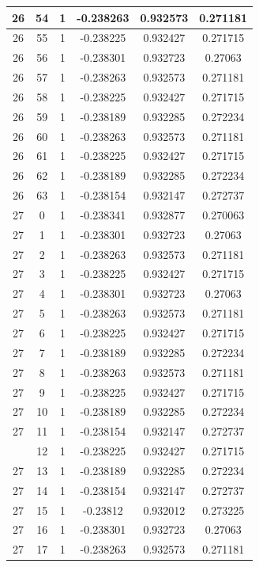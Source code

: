 \documentclass[12pt,a4paper]{article}
\numberwithin{equation}{section}
\numberwithin{figure}{section}
\numberwithin{table}{section}
\begin{document}
\begin{longtable}{|c|c|c|c|c|c|}
26 & 54 & 1 & -0.238263 & 0.932573 & 0.271181 \\ \hline
26 & 55 & 1 & -0.238225 & 0.932427 & 0.271715 \\ \hline
26 & 56 & 1 & -0.238301 & 0.932723 & 0.27063 \\ \hline
26 & 57 & 1 & -0.238263 & 0.932573 & 0.271181 \\ \hline
26 & 58 & 1 & -0.238225 & 0.932427 & 0.271715 \\ \hline
26 & 59 & 1 & -0.238189 & 0.932285 & 0.272234 \\ \hline
26 & 60 & 1 & -0.238263 & 0.932573 & 0.271181 \\ \hline
26 & 61 & 1 & -0.238225 & 0.932427 & 0.271715 \\ \hline
26 & 62 & 1 & -0.238189 & 0.932285 & 0.272234 \\ \hline
26 & 63 & 1 & -0.238154 & 0.932147 & 0.272737 \\ \hline
27 & 0 & 1 & -0.238341 & 0.932877 & 0.270063 \\ \hline
27 & 1 & 1 & -0.238301 & 0.932723 & 0.27063 \\ \hline
27 & 2 & 1 & -0.238263 & 0.932573 & 0.271181 \\ \hline
27 & 3 & 1 & -0.238225 & 0.932427 & 0.271715 \\ \hline
27 & 4 & 1 & -0.238301 & 0.932723 & 0.27063 \\ \hline
27 & 5 & 1 & -0.238263 & 0.932573 & 0.271181 \\ \hline
27 & 6 & 1 & -0.238225 & 0.932427 & 0.271715 \\ \hline
27 & 7 & 1 & -0.238189 & 0.932285 & 0.272234 \\ \hline
27 & 8 & 1 & -0.238263 & 0.932573 & 0.271181 \\ \hline
27 & 9 & 1 & -0.238225 & 0.932427 & 0.271715 \\ \hline
27 & 10 & 1 & -0.238189 & 0.932285 & 0.272234 \\ \hline
27 & 11 & 1 & -0.238154 & 0.932147 & 0.272737 \\ \hline
\pagebreak
27 & 12 & 1 & -0.238225 & 0.932427 & 0.271715 \\ \hline
27 & 13 & 1 & -0.238189 & 0.932285 & 0.272234 \\ \hline
27 & 14 & 1 & -0.238154 & 0.932147 & 0.272737 \\ \hline
27 & 15 & 1 & -0.23812 & 0.932012 & 0.273225 \\ \hline
27 & 16 & 1 & -0.238301 & 0.932723 & 0.27063 \\ \hline
27 & 17 & 1 & -0.238263 & 0.932573 & 0.271181 \\ \hline

\end{longtable}
\end{document}
